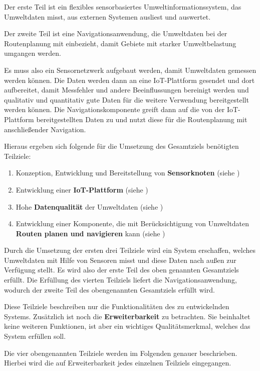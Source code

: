 Der erste Teil ist ein flexibles sensorbasiertes Umweltinformationssystem, das Umweltdaten misst, aus externen Systemen ausliest und auswertet.

Der zweite Teil ist eine Navigationsanwendung, die Umweltdaten bei der Routenplanung mit einbezieht, damit Gebiete mit starker Umweltbelastung umgangen werden.

Es muss also ein Sensornetzwerk aufgebaut werden, damit Umweltdaten gemessen werden können. Die Daten werden dann an eine IoT-Plattform gesendet und dort aufbereitet, damit Messfehler und andere Beeinflussungen bereinigt werden und qualitativ und quantitativ gute Daten für die weitere Verwendung bereitgestellt werden können. Die Navigationskomponente greift dann auf die von der IoT-Plattform bereitgestellten Daten zu und nutzt diese für die Routenplanung mit anschließender Navigation.

Hieraus ergeben sich folgende für die Umsetzung des Gesamtziels benötigten Teilziele:

\begin{enumerate}
 \item Konzeption, Entwicklung und Bereitstellung von \textbf{Sensorknoten} (siehe )
 \item Entwicklung einer \textbf{IoT-Plattform} (siehe )
 \item Hohe \textbf{Datenqualität} der Umweltdaten (siehe )
 \item Entwicklung einer Komponente, die mit Berücksichtigung von Umweltdaten \textbf{Routen planen und navigieren} kann (siehe )
\end{enumerate}

Durch die Umsetzung der ersten drei Teilziele wird ein System erschaffen, welches Umweltdaten mit Hilfe von Sensoren misst und diese Daten nach außen zur Verfügung stellt. Es wird also der erste Teil des oben genannten Gesamtziels erfüllt. Die Erfüllung des vierten Teilziels liefert die Navigationsanwendung, wodurch der zweite Teil des obengenannten Gesamtziels erfüllt wird.

Diese Teilziele beschreiben nur die Funktionalitäten des zu entwickelnden Systems. Zusätzlich ist noch die \textbf{Erweiterbarkeit} zu betrachten. Sie beinhaltet keine weiteren Funktionen, ist aber ein wichtiges Qualitätsmerkmal, welches das System erfüllen soll. 

Die vier obengenannten Teilziele werden im Folgenden genauer beschrieben. Hierbei wird die auf Erweiterbarkeit jedes einzelnen Teilziels eingegangen.

